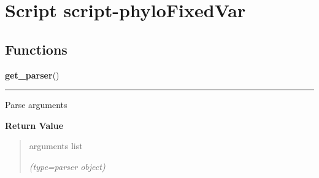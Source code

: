 %
%
%


\section{Script script-phyloFixedVar}

    \label{script-phyloFixedVar}


  \subsection{Functions}

    \label{script-phyloFixedVar:get_parser}

    \vspace{0.5ex}

\hspace{.8\funcindent}\begin{boxedminipage}{\funcwidth}

    \raggedright \textbf{get\_parser}()

    \vspace{-1.5ex}

    \rule{\textwidth}{0.5\fboxrule}
\setlength{\parskip}{2ex}
    Parse arguments

\setlength{\parskip}{1ex}
      \textbf{Return Value}
    \vspace{-1ex}

      \begin{quote}
      arguments list

      {\it (type=parser object)}

      \end{quote}

    \end{boxedminipage}

